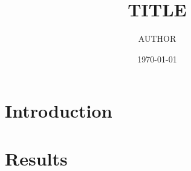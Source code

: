 \documentclass[12pt,a4paper,oneside]{scrreprt}
\title{{{TITLE}}}
\author{{{AUTHOR}}}
\date{\today}
\theoremstyle{plain}
\theoremstyle{definition}
\theoremstyle{remark}
\begin{document}
\maketitle
\tableofcontents
\chapter{Introduction}
\chapter{Results}


\end{document}
